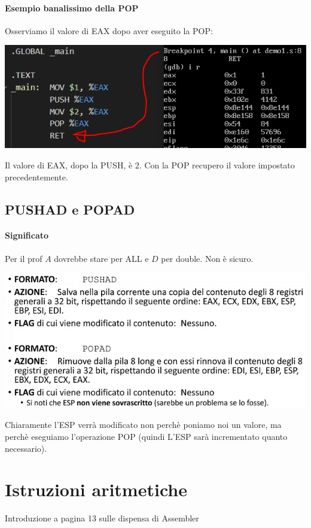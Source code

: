 \documentclass[11pt]{report}
\begin{document}
\paragraph{Esempio banalissimo della POP} Osserviamo il valore di EAX dopo aver eseguito la POP:
\begin{center}
\includegraphics{img/216.PNG}
\end{center}
Il valore di EAX, dopo la PUSH, è $2$. Con la POP recupero il valore impostato precedentemente.

\subsection{PUSHAD e POPAD}
\paragraph{Significato} Per il prof $A$ dovrebbe stare per ALL e $D$ per double. Non è sicuro.
\begin{center}
\includegraphics{img/16.PNG}
\end{center}
Chiaramente l'ESP verrà modificato non perchè poniamo noi un valore, ma perchè eseguiamo l'operazione POP (quindi L'ESP sarà incrementato quanto necessario).

\section{Istruzioni aritmetiche}
Introduzione a pagina 13 sulle dispensa di Assembler
\end{document}
